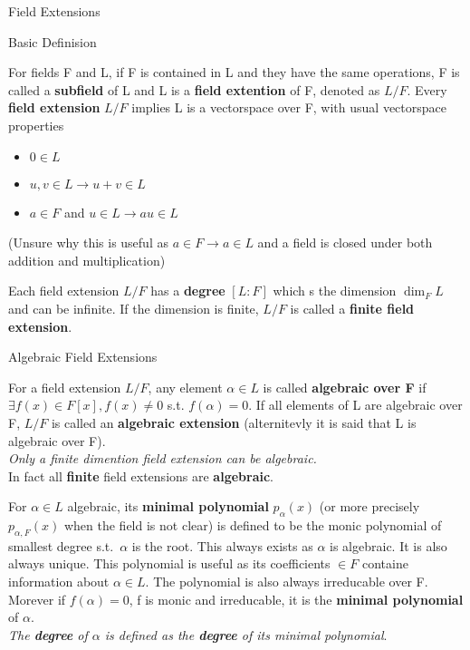 \documentclass[12pt, letterpaper]{article}
\begin{document}
\begin{section}{Field Extensions}

  \begin{subsection}{Basic Definision}

    For fields F and L, if F is contained in L and they have the same operations,
    F is called a \textbf{subfield} of L and L is a \textbf{field extention} of
    F, denoted as \(L/F\). Every \textbf{field extension} \(L/F\) implies L is a
    vectorspace over F, with usual vectorspace properties
    \begin{itemize}
      \item \(0 \in L\)
      \item \(u, v \in L \to u + v \in L\)
      \item \(a \in F\) and \(u \in L \to au \in L\)
    \end{itemize}
    (Unsure why this is useful as \(a \in F \to a \in L\) and a field is closed
    under both addition and multiplication)

    Each field extension \(L/F\) has a \textbf{degree} \([L : F]\) which s the
    dimension \(\dim_{F}L\) and can be infinite. If the dimension is finite, \(L/F\)
    is called a \textbf{finite field extension}.

  \end{subsection}

  \begin{subsection}{Algebraic Field Extensions}

    For a field extension \(L/F\), any element \(\alpha\in L\) is called
    \textbf{algebraic over F} if \(\exists f(x) \in F[x], f(x) \neq 0\) s.t.
    \(f(\alpha) = 0\). If all elements of L are algebraic over F, \(L/F\) is
    called an \textbf{algebraic extension} (alternitevly it is said that L is
    algebraic over F). \\
    \textit{Only a finite dimention field extension can be algebraic.} \\
    In fact all \textbf{finite} field extensions are \textbf{algebraic}.

    For \(\alpha \in L\) algebraic, its \textbf{minimal polynomial}
    \(p_{\alpha}(x)\) (or more precisely \(p_{\alpha, F}(x)\) when the field is
    not clear) is defined to be the monic polynomial of smallest degree s.t.\
    \(\alpha\) is the root. This always exists as \(\alpha\) is algebraic. It is
    also always unique. This polynomial is useful as its coefficients \(\in F\)
    containe information about \(\alpha \in L\). The polynomial is also always
    irreducable over F. \\
    Morever if \(f(\alpha) = 0\), f is monic and irreducable, it is the
    \textbf{minimal polynomial} of \(\alpha\). \\
    \textit{The \textbf{degree} of \(\alpha\) is defined as the \textbf{degree}
      of its minimal polynomial}.


\end{subsection}
\end{section}
\end{document}
